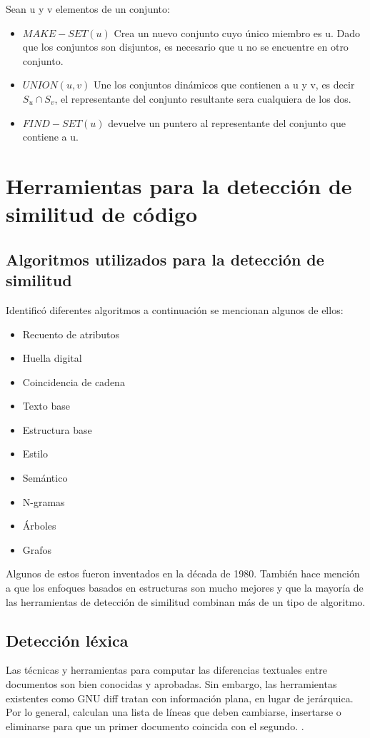 \noindent Sean u y v elementos de un conjunto:
\begin{itemize}
    \item $MAKE-SET(u)$ Crea un nuevo conjunto cuyo único miembro es u. Dado que los conjuntos son disjuntos, es necesario que u no se encuentre en otro conjunto.
    \item $UNION(u, v)$ Une los conjuntos dinámicos que contienen a u y v, es decir $S_u \cap S_v$, el representante del conjunto resultante sera cualquiera de los dos.
    \item $FIND-SET(u)$ devuelve un puntero al representante del conjunto que contiene a u.
\end{itemize}

\section{Herramientas para la detección de similitud de código}
\subsection{Algoritmos utilizados para la detección de similitud}
\cite{10.1145/3313290} Identificó diferentes algoritmos a continuación se mencionan algunos de ellos:
\begin{itemize}
    \item Recuento de atributos
    \item Huella digital
    \item Coincidencia de cadena
    \item Texto base
    \item Estructura base
    \item Estilo
    \item Semántico
    \item N-gramas
    \item Árboles
    \item Grafos
\end{itemize}
Algunos de estos fueron inventados en la década de 1980. También hace mención a que los enfoques basados en estructuras son mucho mejores y que la mayoría de las herramientas de detección de similitud combinan más de un tipo de algoritmo.
\subsection{Detección léxica}
Las técnicas y herramientas para computar las diferencias textuales entre documentos son bien conocidas y aprobadas. Sin embargo, las herramientas existentes como GNU diff tratan con información plana, en lugar de jerárquica. Por lo general, calculan una lista de líneas que deben cambiarse, insertarse o eliminarse para que un primer documento coincida con el segundo. \cite{ChangeDistiller}.